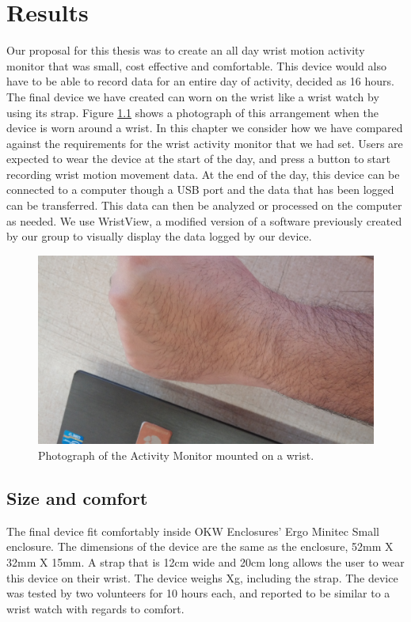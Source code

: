 \chapter{Results}
\label{Chap:Results}

Our proposal for this thesis was to create an all day wrist motion activity monitor
that was small, cost effective and comfortable.
This device would also have to be able to record data for an entire day of activity,
decided as 16 hours.
The final device we have created can worn on the wrist like a wrist watch by using its strap.
Figure \ref{Fig:WristPhoto} shows a photograph of this arrangement when the device is worn around a wrist.
In this chapter we consider how we have compared against the requirements for the wrist activity monitor that we had set.
Users are expected to wear the device at the start of the day,
and press a button to start recording wrist motion movement data.
At the end of the day,
this device can be connected to a computer though a USB port and the data that has been logged can be transferred.
This data can then be analyzed or processed on the computer as needed.
We use WristView, a modified version of a software previously created by our group to visually display the data logged by our device. 
\begin{figure}
\begin{center}
\includegraphics[width=\textwidth]{images/WristPhoto.jpg}
\caption{Photograph of the Activity Monitor mounted on a wrist.}
\label{Fig:WristPhoto}
\end{center}
\end{figure}

\section{Size and comfort}
\label{Sec:ResultsSize}
The final device fit comfortably inside OKW Enclosures' Ergo Minitec Small enclosure.
The dimensions of the device are the same as the enclosure,
52mm X 32mm X 15mm.
A strap that is 12cm wide and 20cm long allows the user to wear this device on their wrist.
The device weighs Xg, including the strap.
The device was tested by two volunteers for 10 hours each,
and reported to be similar to a wrist watch with regards to comfort.

